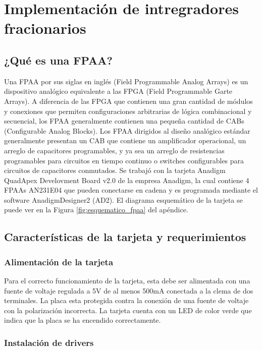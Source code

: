 \chapter{Implementación de intregradores fracionarios}

	\section{¿Qué es una FPAA?}
	Una FPAA  por sus siglas en inglés (Field Programmable Analog Arrays) es un dispositivo analógico equivalente a las FPGA (Field Programmable Garte Arrays). A diferencia de las FPGA que contienen una gran cantidad de módulos y conexiones que permiten configuraciones arbitrarias de lógica combinacional y secuencial, los FPAA generalmente contienen una pequeña cantidad de CABs (Configurable Analog Blocks). Los FPAA dirigidos al diseño analógico estándar generalmente presentan un CAB que contiene un amplificador operacional, un arreglo de capacitores programables, y ya sea un arreglo de resistencias programables para circuitos en tiempo continuo o switches configurables para circuitos de capacitores conmutados.
	Se trabajó con la tarjeta Anadigm QuadApex Develovment Board v2.0 de la empresa Anadigm, la cual contiene 4 FPAAs AN231E04 que pueden conectarse en cadena y es programada mediante el software AnadigmDesigner2 (AD2). El diagrama esquemático de la tarjeta se puede ver en la Figura \ref{fig:esquematico_fpaa} del apéndice.
	
	\section{Características de la tarjeta y requerimientos}
	
		\subsection{Alimentación de la tarjeta}
	Para el correcto funcionamiento de la tarjeta, esta debe ser alimentada con una fuente de voltaje regulada a 5V de al menos 500mA conectada a la clema de dos terminales. La placa esta protegida contra la conexión de una fuente de voltaje con la polarización incorrecta. La tarjeta cuenta con un LED de color verde que indica que la placa se ha encendido correctamente. 
	
		\subsection{Instalación de drivers}


